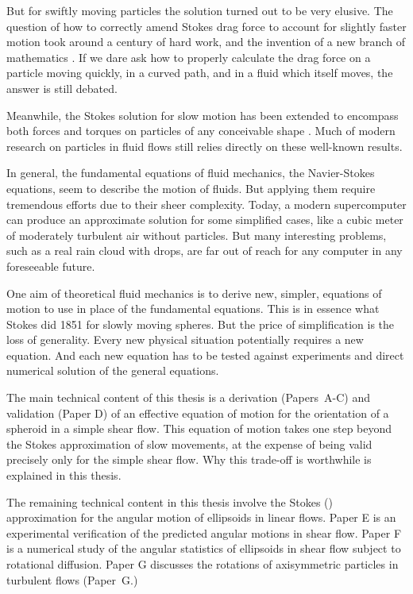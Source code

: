 \documentclass[thesis.tex]{subfiles}
\begin{document}
But for swiftly moving particles
the solution turned out to be very elusive. The question of how to correctly amend Stokes drag force to account for slightly faster motion took around a century of hard work, and the invention of a new branch of mathematics \cite{veysey2007}. If we dare ask how to properly calculate the drag force on a particle moving quickly, in a curved path, and in a fluid which itself moves, the answer is still debated.

Meanwhile, the Stokes solution for slow motion has been extended to encompass both forces and torques on particles of any conceivable shape \cite{jeffery1922,brenner1974,kim1991}. Much of modern research on particles in fluid flows still relies directly on these well-known results.

In general, the fundamental equations of fluid mechanics, the Navier-Stokes equations, seem to describe the motion of fluids. But applying them require tremendous efforts due to their sheer complexity. Today, a modern supercomputer can produce an approximate solution for some simplified cases, like a cubic meter of moderately turbulent air without particles. But many interesting problems, such as a real rain cloud with drops, are far out of reach for any computer in any foreseeable future.

One aim of theoretical fluid mechanics is to derive new, simpler, equations of motion to use in place of the fundamental equations. This is in essence what Stokes did 1851 for slowly moving spheres. But the price of simplification is the loss of generality. Every new physical situation potentially requires a new equation. And each new equation has to be tested against experiments and direct numerical solution of the general equations.

The main technical content of this thesis is a derivation (Papers~A-C) and validation (Paper D) of an effective equation of motion for the orientation of a spheroid in a simple shear flow. This equation of motion takes one step beyond the Stokes approximation of slow movements, at the expense of being valid precisely only for the simple shear flow. Why this trade-off is worthwhile is explained in this thesis.

The remaining technical content in this thesis involve the Stokes (\citet{jeffery1922}) approximation for the angular motion of ellipsoids in linear flows. Paper E is an experimental verification of the predicted angular motions in shear flow. Paper F is a numerical study of the angular statistics of ellipsoids in shear flow subject to rotational diffusion. Paper G discusses the rotations of axisymmetric particles in turbulent flows (Paper~G.)
\end{document}
